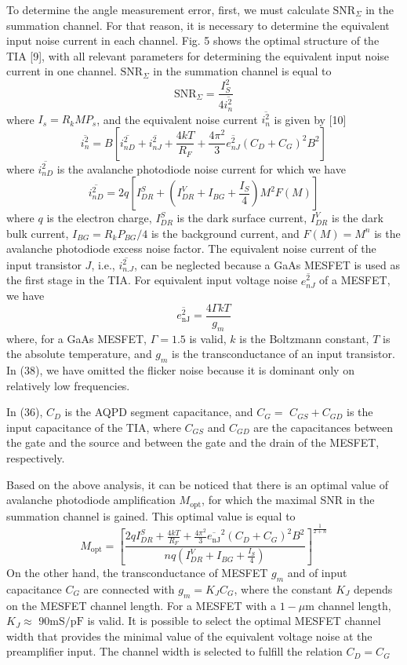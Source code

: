 \documentclass[10pt]{article}
\begin{document}
To determine the angle measurement error, first, we must calculate \(\mathrm{SNR}_{\Sigma}\) in the summation channel. For that reason, it is necessary to determine the equivalent input noise current in each channel. Fig. 5 shows the optimal structure of the TIA [9], with all relevant parameters for determining the equivalent input noise current in one channel. \(\mathrm{SNR}_{\Sigma}\) in the summation channel is equal to
\[
\mathrm{SNR}_{\Sigma}=\frac{I_{S}^{2}}{4 \overline{i_{n}^{2}}}
\]
where \(I_{s}=R_{k} M P_{s}\), and the equivalent noise current \(\overline{i_{n}^{2}}\) is given by [10]
\[
\overline{i_{n}^{2}}=B\left[\overline{i_{n D}^{2}}+\overline{i_{n J}^{2}}+\frac{4 k T}{R_{F}}+\frac{4 \pi^{2}}{3} \overline{e_{n J}^{2}}\left(C_{D}+C_{G}\right)^{2} B^{2}\right]
\]
where \(\overline{i_{n D}^{2}}\) is the avalanche photodiode noise current for which we have
\[
\overline{i_{n D}^{2}}=2 q\left[I_{D R}^{S}+\left(I_{D R}^{V}+I_{B G}+\frac{I_{S}}{4}\right) M^{2} F(M)\right]
\]
where \(q\) is the electron charge, \(I_{D R}^{S}\) is the dark surface current, \(I_{D R}^{V}\) is the dark bulk current, \(I_{B G}=R_{k} P_{B G} / 4\) is the background current, and \(F(M)=M^{n}\) is the avalanche photodiode excess noise factor. The equivalent noise current of the input transistor \(J\), i.e., \(\overline{i_{n . J}^{2}}\), can be neglected because a GaAs MESFET is used as the first stage in the TIA. For equivalent input voltage noise \(\overline{e_{n J}^{2}}\) of a MESFET, we have
\[
\overline{e_{\mathrm{nJ}}^{2}}=\frac{4 \Gamma k T}{g_{m}}
\]
where, for a GaAs MESFET, \(\Gamma=1.5\) is valid, \(k\) is the Boltzmann constant, \(T\) is the absolute temperature, and \(g_{m}\) is the transconductance of an input transistor. In (38), we have omitted the flicker noise because it is dominant only on relatively low frequencies.

In (36), \(C_{D}\) is the AQPD segment capacitance, and \(C_{G}=\) \(C_{G S}+C_{G D}\) is the input capacitance of the TIA, where \(C_{G S}\) and \(C_{G D}\) are the capacitances between the gate and the source and between the gate and the drain of the MESFET, respectively.

Based on the above analysis, it can be noticed that there is an optimal value of avalanche photodiode amplification \(M_{\mathrm{opt}}\), for which the maximal SNR in the summation channel is gained. This optimal value is equal to
\[
M_{\mathrm{opt}}=\left[\frac{2 q I_{D R}^{S}+\frac{4 k T}{R_{F}}+\frac{4 \pi^{2}}{3} \overline{e_{\mathrm{nJ}}}^{2}\left(C_{D}+C_{G}\right)^{2} B^{2}}{n q\left(I_{D R}^{V}+I_{B G}+\frac{I_{S}}{4}\right)}\right]^{\frac{1}{2+n}}
\]
On the other hand, the transconductance of MESFET \(g_{m}\) and of input capacitance \(C_{G}\) are connected with \(g_{m}=K_{J} C_{G}\), where the constant \(K_{J}\) depends on the MESFET channel length. For a MESFET with a \(1-\mu \mathrm{m}\) channel length, \(K_{J} \approx\) \(90 \mathrm{mS} / \mathrm{pF}\) is valid. It is possible to select the optimal MESFET channel width that provides the minimal value of the equivalent voltage noise at the preamplifier input. The channel width is selected to fulfill the relation \(C_{D}=C_{G}\)
\end{document}
